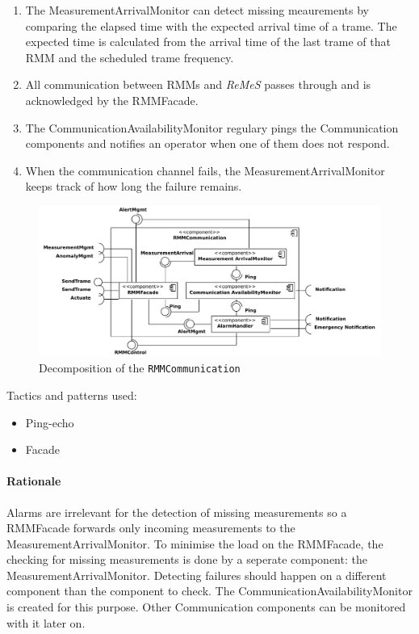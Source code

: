\documentclass[a4paper,10pt]{article}
\newcommand{\rem}{\emph{ReMeS}\xspace}
\begin{document}
\begin{enumerate}
	\item The MeasurementArrivalMonitor can detect missing meaurements by comparing the elapsed time with the expected arrival time of a trame. The expected time is calculated from the arrival time of the last trame of that RMM and the scheduled trame frequency.
    \item All communication between RMMs and \rem passes through and is acknowledged by the RMMFacade.
    \item The CommunicationAvailabilityMonitor regulary pings the Communication components and notifies an operator when one of them does not respond.
    \item When the communication channel fails, the MeasurementArrivalMonitor keeps track of how long the failure remains.
\end{enumerate}

\begin{figure}[!htp]
    \centering
    \includegraphics[width=\textwidth]{Decomposition_ Communication with RMM}
    \caption{Decomposition of the \texttt{RMMCommunication}}\label{fig:dec_rmmcomm}
\end{figure}

\noindent Tactics and patterns used:
\begin{itemize}
	\item Ping-echo
    \item Facade
\end{itemize}

\paragraph{Rationale} Alarms are irrelevant for the detection of missing measurements so a RMMFacade forwards only incoming measurements to the MeasurementArrivalMonitor. To minimise the load on the RMMFacade, the checking for missing measurements is done by a seperate component: the MeasurementArrivalMonitor. Detecting failures should happen on a different component than the component to check. The CommunicationAvailabilityMonitor is created for this purpose. Other Communication components can be monitored with it later on.
\end{document}
